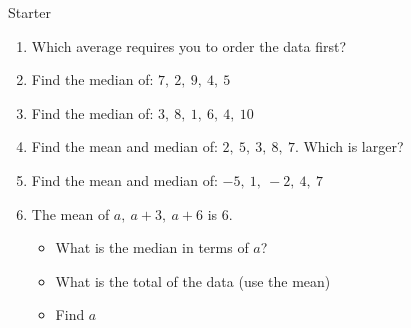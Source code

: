 \documentclass{beamer}
\newcommand{\ashow}[1]{\uncover<2->{\textcolor{red}{\small #1}}}
\newcommand{\ashowq}[1]{\alt<2->{\textcolor{red}{\small #1}}{?}}
\begin{document}
\begin{frame}{Starter}
\vspace{-0.8em}

\footnotesize
\begin{enumerate}\itemsep2pt
  \item Which average requires you to order the data first? \ashow{Median}
  \item Find the median of: $7,\ 2,\ 9,\ 4,\ 5$ \ashow{$=5$}
  \item Find the median of: $3,\ 8,\ 1,\ 6,\ 4,\ 10$ \ashow{$=5$}
  \item Find the mean and median of: $2,\ 5,\ 3,\ 8,\ 7$.  
        Which is larger? \ashow{Mean $=5$, median $=5$ (equal).}
  \item Find the mean and median of: $-5,\ 1,\ -2,\ 4,\ 7$ \ashow{Mean $=1$, median $=1$.}
  \item The mean of $a,\ a+3,\ a+6$ is $6$.
        \begin{itemize}\footnotesize
        \item What is the median in terms of $a$? \ashow{$a+3$}
          \item What is the total of the data (use the mean) \ashow{$18$}
          \item Find $a$ \ashow{$a=3$}
        \end{itemize}
\end{enumerate}

\end{frame}
\end{document}
